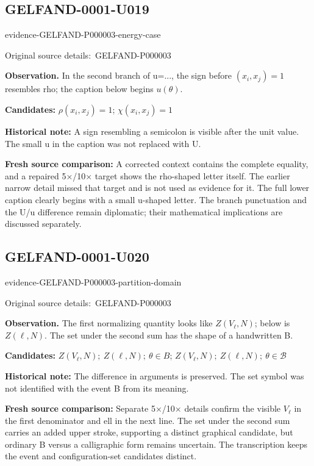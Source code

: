 \documentclass[11pt]{article}
\newcommand{\EvidenceBlock}[4]{%
 \par\smallskip\noindent\begin{minipage}{\linewidth}
 \begin{minipage}[t]{.47\linewidth}\vspace{0pt}\centering
 \csname evidence-#1-#2\endcsname\par
 {\scriptsize\SourceCropCaption\ #1}\par
 \end{minipage}\hfill
 \begin{minipage}[t]{.49\linewidth}\vspace{0pt}\raggedright
 {\small\color{orange!65!black}\textbf{#4} #3}\par
 \end{minipage}
 \end{minipage}\par\smallskip}
\newcommand{\SourceCropCaption}{Original source details:}\newcommand{\ReadingCaption}{Uncertain reading.}\newcommand{\IncompleteCaption}{Undeciphered passage.}\newcommand{\DiagramCaption}{Diagram and typed description.}
\begin{document}
\subsection*{GELFAND-0001-U019}
\EvidenceBlock{GELFAND-P000003}{energy-case}{In the second branch of u=..., the sign before \((x_i,x_j)=1\) resembles rho; the caption below begins \(u(\theta)\).}{Observation.}
\par\smallskip\noindent\textbf{Candidates: } \(\rho(x_i,x_j)=1\); \(\chi(x_i,x_j)=1\)\par
\par\smallskip\noindent\textbf{Historical note: } A sign resembling a semicolon is visible after the unit value. The small u in the caption was not replaced with U.\par
\par\smallskip\noindent\textbf{Fresh source comparison: } A corrected context contains the complete equality, and a repaired 5×/10× target shows the rho-shaped letter itself. The earlier narrow detail missed that target and is not used as evidence for it. The full lower caption clearly begins with a small u-shaped letter. The branch punctuation and the U/u difference remain diplomatic; their mathematical implications are discussed separately.\par

\subsection*{GELFAND-0001-U020}
\EvidenceBlock{GELFAND-P000003}{partition-domain}{The first normalizing quantity looks like \(Z(V_\ell,N)\); below is \(Z(\ell,N)\). The set under the second sum has the shape of a handwritten B.}{Observation.}
\par\smallskip\noindent\textbf{Candidates: } \(Z(V_\ell,N);\ Z(\ell,N);\ \theta\in B\); \(Z(V_\ell,N);\ Z(\ell,N);\ \theta\in\mathcal B\)\par
\par\smallskip\noindent\textbf{Historical note: } The difference in arguments is preserved. The set symbol was not identified with the event B from its meaning.\par
\par\smallskip\noindent\textbf{Fresh source comparison: } Separate 5×/10× details confirm the visible \(V_\ell\) in the first denominator and ell in the next line. The set under the second sum carries an added upper stroke, supporting a distinct graphical candidate, but ordinary B versus a calligraphic form remains uncertain. The transcription keeps the event and configuration-set candidates distinct.\par
\end{document}
